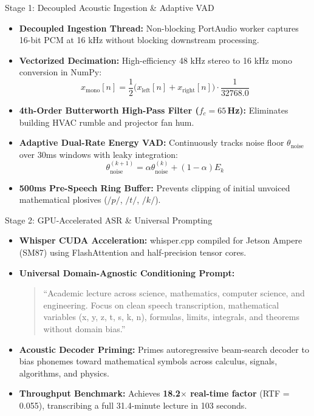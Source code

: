 \documentclass[aspectratio=169,10pt]{beamer}
\begin{document}
\begin{frame}{Stage 1: Decoupled Acoustic Ingestion \& Adaptive VAD}
  \begin{itemize}
    \item \textbf{Decoupled Ingestion Thread:} Non-blocking PortAudio worker captures 16-bit PCM at 16 kHz without blocking downstream processing.
    \item \textbf{Vectorized Decimation:} High-efficiency 48 kHz stereo to 16 kHz mono conversion in NumPy:
    \[ x_{\text{mono}}[n] = \frac{1}{2}\big(x_{\text{left}}[n] + x_{\text{right}}[n]\big) \cdot \frac{1}{32768.0} \]
    \item \textbf{4th-Order Butterworth High-Pass Filter ($f_c = 65$\,Hz):} Eliminates building HVAC rumble and projector fan hum.
    \item \textbf{Adaptive Dual-Rate Energy VAD:} Continuously tracks noise floor $\theta_{\text{noise}}$ over 30ms windows with leaky integration:
    \[ \theta_{\text{noise}}^{(k+1)} = \alpha \theta_{\text{noise}}^{(k)} + (1 - \alpha) E_k \]
    \item \textbf{500ms Pre-Speech Ring Buffer:} Prevents clipping of initial unvoiced mathematical plosives ($/p/$, $/t/$, $/k/$).
  \end{itemize}
\end{frame}

\begin{frame}{Stage 2: GPU-Accelerated ASR \& Universal Prompting}
  \begin{itemize}
    \item \textbf{Whisper CUDA Acceleration:} whisper.cpp compiled for Jetson Ampere (SM87) using FlashAttention and half-precision tensor cores.
    \item \textbf{Universal Domain-Agnostic Conditioning Prompt:}
    \begin{quote}
      \footnotesize\ttfamily
      ``Academic lecture across science, mathematics, computer science, and engineering. Focus on clean speech transcription, mathematical variables (x, y, z, t, s, k, n), formulas, limits, integrals, and theorems without domain bias.''
    \end{quote}
    \item \textbf{Acoustic Decoder Priming:} Primes autoregressive beam-search decoder to bias phonemes toward mathematical symbols across calculus, signals, algorithms, and physics.
    \item \textbf{Throughput Benchmark:} Achieves \textbf{18.2$\times$ real-time factor} (RTF = 0.055), transcribing a full 31.4-minute lecture in 103 seconds.
  \end{itemize}
\end{frame}
\end{document}

